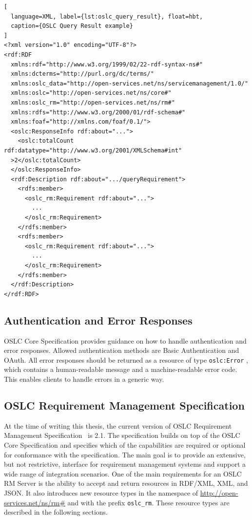 \begin{lstlisting}[
  language=XML, label={lst:oslc_query_result}, float=hbt,
  caption={OSLC Query Result example}
]
<?xml version="1.0" encoding="UTF-8"?>
<rdf:RDF
  xmlns:rdf="http://www.w3.org/1999/02/22-rdf-syntax-ns#"
  xmlns:dcterms="http://purl.org/dc/terms/"
  xmlns:oslc_data="http://open-services.net/ns/servicemanagement/1.0/"
  xmlns:oslc="http://open-services.net/ns/core#"
  xmlns:oslc_rm="http://open-services.net/ns/rm#"
  xmlns:rdfs="http://www.w3.org/2000/01/rdf-schema#"
  xmlns:foaf="http://xmlns.com/foaf/0.1/">
  <oslc:ResponseInfo rdf:about="...">
    <oslc:totalCount rdf:datatype="http://www.w3.org/2001/XMLSchema#int"
  >2</oslc:totalCount>
  </oslc:ResponseInfo>
  <rdf:Description rdf:about=".../queryRequirement">
    <rdfs:member>
      <oslc_rm:Requirement rdf:about="...">
        ...
      </oslc_rm:Requirement>
    </rdfs:member>
    <rdfs:member>
      <oslc_rm:Requirement rdf:about="...">
        ...
      </oslc_rm:Requirement>
    </rdfs:member>
  </rdf:Description>
</rdf:RDF>
\end{lstlisting}

\subsection*{Authentication and Error Responses}
OSLC Core Specification provides guidance on how to handle authentication and error responses. Allowed authentication methods are Basic Authentication and OAuth. All error responses should be returned as a resource of type \texttt{oslc:Error} \cite{oslc_core_error}, which contains a human-readable message and a machine-readable error code. This enables clients to handle errors in a generic way.

\subsection{OSLC Requirement Management Specification}
\label{sec:oslc_rm_specification}
At the time of writing this thesis, the current version of OSLC Requirement Management Specification \cite{oslc_requirement_management_specification} is 2.1. The specification builds on top of the OSLC Core Specification and specifies which of the capabilities are required or optional for conformance with the specification. The main goal is to provide an extensive, but not restrictive, interface for requirement management systems and support a wide range of integration scenarios. One of the main requirements for an OSLC RM Server is the ability to accept and return resources in RDF/XML, XML, and JSON. It also introduces new resource types in the namespace of \url{http://open-services.net/ns/rm\#} and with the prefix \texttt{oslc\_rm}. These resource types are described in the following sections.


